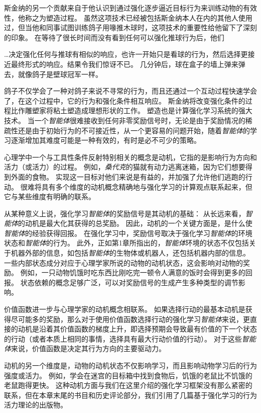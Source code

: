 斯金纳的另一个贡献来自于他认识到通过强化逐步逼近目标行为来训练动物的有效性，他称之为塑造过程。
虽然这项技术已经被包括斯金纳本人在内的其他人使用过，但当他和同事试图训练鸽子用喙推木球时，这项技术的重要性给他留下了深刻的印象。
在等待了很长时间而没有看到任何可以强化推球行为后，他们


…决定强化任何与推球有相似的响应，也许一开始只是看球的行为，然后选择更接近最终形式的响应。结果令我们惊讶不已。
几分钟后，球在盒子的墙上弹来弹去，就像鸽子是壁球冠军一样\cite{skinner1958reinforcement}。


鸽子不仅学会了一种对鸽子来说不寻常的行为，而且还通过一个互动过程快速学会了，在这个过程中，它的行为和强化条件相互响应。
斯金纳将改变强化条件的过程比作雕塑家将粘土塑造成理想形状的工作。
塑造也是计算强化学习系统的强大技术。
当一个\textit{智能体}很难接收到任何非零奖励信号时，无论是由于奖励情况的稀疏性还是由于初始行为的不可接近性，从一个更容易的问题开始，随着\textit{智能体}的学习逐渐增加其难度可能是一种有效的，有时是必不可少的策略。


心理学中一个与工具性条件反射特别相关的概念是动机，它指的是影响行为方向和活力（或活力）的过程。
例如，\textit{桑代克}的猫就有动力逃离迷箱，因为它们想要得到外面的食物。
实现这一目标对他们来说是有益的，并加强了允许他们逃跑的行动。
很难将具有多个维度的动机概念精确地与强化学习的计算观点联系起来，但它与某些维度有明确的联系。


从某种意义上说，强化学习\textit{智能体}的奖励信号是其动机的基础：
从长远来看，\textit{智能体}的动机是最大化其获得的总奖励。
因此，动机的一个关键方面是，是什么使\textit{智能体}的经验获得回报。
在强化学习中，奖励信号取决于强化学习\textit{智能体}的环境状态和\textit{智能体}的行为。
此外，正如第1章所指出的，\textit{智能体}环境的状态不仅包括关于机器外部的信息，如包括\textit{智能体}的生物体或机器人，还包括机器内部的信息。
一些内部状态成分对应于心理学家所说的动物的动机状态，这会影响对动物的奖励。
例如，一只动物饥饿时吃东西比刚吃完一顿令人满意的饭时会得到更多的回报。
状态依赖的概念足够广泛，可以对奖励信号的生成产生多种类型的调节影响。


价值函数进一步与心理学家的动机概念相联系。
如果选择行动的最基本动机是获得尽可能多的奖励，那么对于使用价值函数选择行动的强化学习\textit{智能体}来说，更直接的动机是沿着其价值函数的梯度上升，即选择预期会导致最有价值的下一个状态的行动（或者本质上相同的事情，选择具有最大行动价值的行动）。
对于这些\textit{智能体}来说，价值函数是决定其行为方向的主要驱动力。


动机的另一个维度是，动物的动机状态不仅影响学习，而且影响动物学习后的行为强度或活力。
例如，学会在迷宫的目标箱中找到食物后，饥饿的老鼠比不饥饿的老鼠跑得更快。
这种动机方面与我们在这里介绍的强化学习框架没有那么紧密的联系，但在本章末尾的书目和历史评论部分，我们引用了几篇基于强化学习的行为活力理论的出版物。


